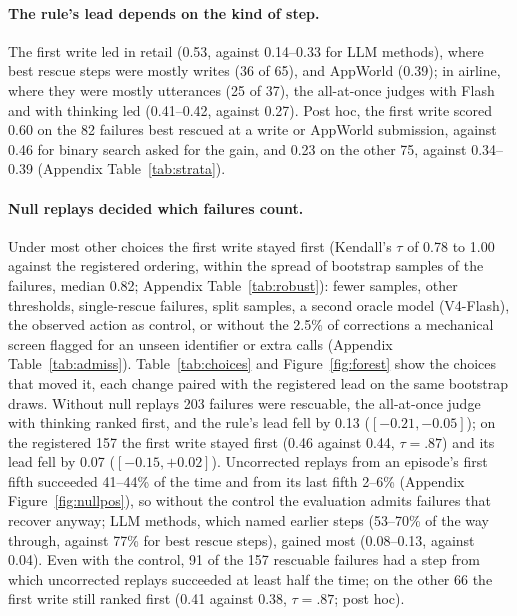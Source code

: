 \documentclass[11pt]{article}
\begin{document}
\paragraph{The rule's lead depends on the kind of step.} The first write led in retail (0.53, against 0.14--0.33 for LLM methods), where best rescue steps were mostly writes (36 of 65), and AppWorld (0.39); in airline, where they were mostly utterances (25 of 37), the all-at-once judges with Flash and with thinking led (0.41--0.42, against 0.27). Post hoc, the first write scored 0.60 on the 82 failures best rescued at a write or AppWorld submission, against 0.46 for binary search asked for the gain, and 0.23 on the other 75, against 0.34--0.39 (Appendix Table~\ref{tab:strata}).

\paragraph{Null replays decided which failures count.}
\label{sec:robust}
Under most other choices the first write stayed first (Kendall's $\tau$ of 0.78 to 1.00 against the registered ordering, within the spread of bootstrap samples of the failures, median 0.82; Appendix Table~\ref{tab:robust}): fewer samples, other thresholds, single-rescue failures, split samples, a second oracle model (V4-Flash), the observed action as control, or without the 2.5\% of corrections a mechanical screen flagged for an unseen identifier or extra calls (Appendix Table~\ref{tab:admiss}). Table~\ref{tab:choices} and Figure~\ref{fig:forest} show the choices that moved it, each change paired with the registered lead on the same bootstrap draws. Without null replays 203 failures were rescuable, the all-at-once judge with thinking ranked first, and the rule's lead fell by 0.13 ($[-0.21,-0.05]$); on the registered 157 the first write stayed first (0.46 against 0.44, $\tau=.87$) and its lead fell by 0.07 ($[-0.15,+0.02]$). Uncorrected replays from an episode's first fifth succeeded 41--44\% of the time and from its last fifth 2--6\% (Appendix Figure~\ref{fig:nullpos}), so without the control the evaluation admits failures that recover anyway; LLM methods, which named earlier steps (53--70\% of the way through, against 77\% for best rescue steps), gained most (0.08--0.13, against 0.04). Even with the control, 91 of the 157 rescuable failures had a step from which uncorrected replays succeeded at least half the time; on the other 66 the first write still ranked first (0.41 against 0.38, $\tau=.87$; post hoc).
\end{document}
